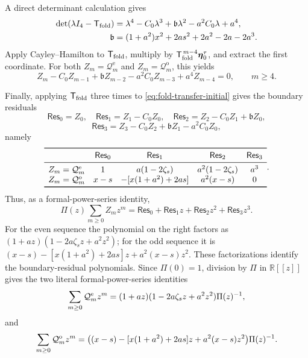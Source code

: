 \documentclass[a4paper,preprint,12pt,nopreprintline,sort&compress]{elsarticle}
\numberwithin{equation}{section}
\theoremstyle{remark}
\begin{document}
A direct determinant calculation gives
\begin{equation}\label{eq:fold-transfer-characteristic}
\begin{aligned}
 \det(\lambda I_4-\mathsf T_{\rm fold})
 &=
 \lambda^4-C_0\lambda^3+\mathfrak b\lambda^2
 -a^2C_0\lambda+a^4,\\
 \mathfrak b
 &=(1+a^2)x^2+2as^2+2a^2-2a-2a^3.
\end{aligned}
\end{equation}
Apply Cayley--Hamilton to \(\mathsf T_{\rm fold}\), multiply by
\(\mathsf T_{\rm fold}^{\,m-4}\boldsymbol\eta_0^\tau\), and extract the
first coordinate.  For both \(Z_m=\mathcal Q_m^{\mathrm e}\) and
\(Z_m=\mathcal Q_m^{\mathrm o}\), this yields
\begin{equation}\label{eq:fold-recurrence}
 Z_m-C_0Z_{m-1}+\mathfrak bZ_{m-2}
 -a^2C_0Z_{m-3}+a^4Z_{m-4}=0,
 \qquad m\geq4.
\end{equation}

Finally, applying \(\mathsf T_{\rm fold}\) three times to
\eqref{eq:fold-transfer-initial} gives the boundary residuals
\[
 \mathsf{Res}_0=Z_0,\quad
 \mathsf{Res}_1=Z_1-C_0Z_0,\quad
 \mathsf{Res}_2=Z_2-C_0Z_1+\mathfrak bZ_0,
\]
\[
 \mathsf{Res}_3
 =Z_3-C_0Z_2+\mathfrak bZ_1-a^2C_0Z_0,
\]
namely
\[
\begin{array}{ccccc}
 \toprule
 &\mathsf{Res}_0&\mathsf{Res}_1&\mathsf{Res}_2&\mathsf{Res}_3\\ \midrule
 Z_m=\mathcal Q_m^{\rm e}
 &1&a(1-2\zeta_s)&a^2(1-2\zeta_s)&a^3\\
 Z_m=\mathcal Q_m^{\rm o}
 &x-s&-[x(1+a^2)+2as]&a^2(x-s)&0\\
 \bottomrule
\end{array}.
\]
Thus, as a formal-power-series identity,
\[
 \Pi(z)\sum_{m\geq0}Z_mz^m
 =\mathsf{Res}_0+\mathsf{Res}_1z+\mathsf{Res}_2z^2+\mathsf{Res}_3z^3.
\]
For the even sequence the polynomial on the right factors as
\((1+az)(1-2a\zeta_sz+a^2z^2)\); for the odd sequence it is
\((x-s)-[x(1+a^2)+2as]z+a^2(x-s)z^2\).  These factorizations identify the
boundary-residual polynomials.  Since \(\Pi(0)=1\), division by \(\Pi\) in
\(\mathbb R[[z]]\) gives the two literal formal-power-series identities
\begin{equation}\label{eq:fold-generating-even}
 \sum_{m\geq0}\mathcal Q_m^{\rm e}z^m
 =(1+az)(1-2a\zeta_sz+a^2z^2)\Pi(z)^{-1},
\end{equation}
and
\begin{equation}\label{eq:fold-generating-odd}
 \sum_{m\geq0}\mathcal Q_m^{\rm o}z^m
 =\bigl((x-s)-[x(1+a^2)+2as]z+a^2(x-s)z^2\bigr)
  \Pi(z)^{-1}.
\end{equation}
\end{document}
